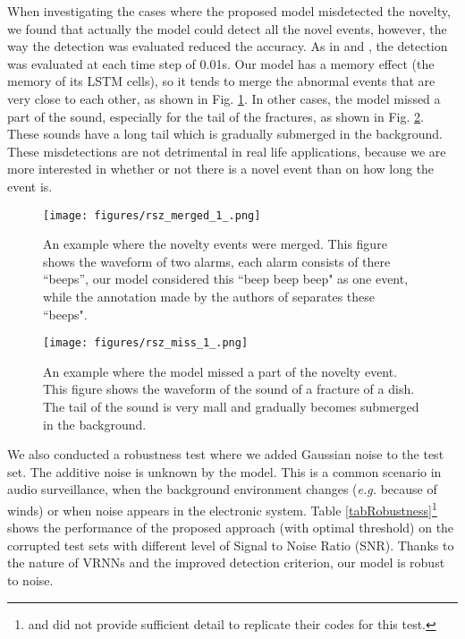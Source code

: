 \documentclass{article}
\begin{document}
When investigating the cases where the proposed model misdetected the novelty, we found that actually the model could detect all the novel events, however, the way the detection was evaluated reduced the accuracy. As in \cite{marchi_novel_2015} and \cite{principi_acoustic_2017}, the detection was evaluated at each time step of 0.01s. Our model has a memory effect (the memory of its LSTM cells), so it tends to merge the abnormal events that are very close to each other, as shown in Fig. \ref{figMerged}. In other cases, the model missed a part of the sound, especially for the tail of the fractures, as shown in Fig. \ref{figMiss}. These sounds have a long tail which is gradually submerged in the background. 
These misdetections are not detrimental in real life applications, because we are more interested in whether or not there is a novel event than on how long the event is.

\begin{figure}[h!]
  \centering
  \texttt{[image: figures/rsz\_merged\_1\_.png]}\caption{An example where the novelty events were merged. This figure shows the waveform of two alarms, each alarm consists of there ``beeps'', our model considered this ``beep beep beep" as one event, while the annotation made by the authors of \cite{marchi_novel_2015} separates these ``beeps". } \label{figMerged}
\end{figure}
\begin{figure}[!]
  \centering
  \texttt{[image: figures/rsz\_miss\_1\_.png]}\caption{An example where the model missed a part of the novelty event. This figure shows the waveform of the sound of a fracture of a dish. The tail of the sound is very mall and gradually becomes submerged in the background.} \label{figMiss}
  \vspace{-3mm}
\end{figure}

We also conducted a robustness test where we added Gaussian noise to the test set. The additive noise is unknown by the model. This is a common scenario in audio surveillance, when the background environment changes ({\em e.g.} because of winds) or when noise appears in the electronic system. Table \ref{tabRobustness}\footnote{\cite{marchi_novel_2015} and \cite{principi_acoustic_2017} did not provide sufficient detail to replicate their codes for this test.} shows the performance of the proposed approach (with optimal threshold) on the corrupted test sets with different level of Signal to Noise Ratio (SNR). Thanks to the nature of VRNNs and the improved detection criterion, our model is robust to noise.
\end{document}
